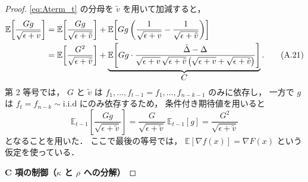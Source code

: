 \documentclass[dvipdfmx,a4paper,11pt]{jsarticle}
\begin{document}
\begin{proof}
\eqref{eq:Aterm_t} の分母を $\tilde{v}$ を用いて加減すると，
\begin{align}
    \mathbb{E}\!\left[\frac{Gg}{\sqrt{\epsilon+v}}\right]
    &= \mathbb{E}\!\left[\frac{Gg}{\sqrt{\epsilon+\tilde{v}}}\right]
     + \mathbb{E}\!\left[
        Gg\left(
          \frac{1}{\sqrt{\epsilon+v}} - \frac{1}{\sqrt{\epsilon+\tilde{v}}}
        \right)
      \right] \notag\\
    &= \mathbb{E}\!\left[\frac{G^2}{\sqrt{\epsilon+\tilde{v}}}\right]
     + \underbrace{\mathbb{E}\!\left[
         Gg \cdot
         \frac{\bar{\Delta} - \Delta}{
           \sqrt{\epsilon+v}\,\sqrt{\epsilon+\tilde{v}}\,
           \bigl(\sqrt{\epsilon+v}+\sqrt{\epsilon+\tilde{v}}\bigr)
         }
       \right]}_{\displaystyle C}.
    \tag{A.21}
    \label{eq:Aterm_decomp_Delta}
\end{align}
第 2 等号では，
$G$ と $\tilde{v}$ は $f_1,\ldots,f_{t-1}=f_1,\ldots,f_{n-k-1}$ のみに依存し，
一方で $g$ は $f_t=f_{n-k}\sim \text{i.i.d} $ にのみ依存するため，
条件付き期待値を用いると
\[
  \mathbb{E}_{t-1}\!\left[\frac{Gg}{\sqrt{\epsilon+\tilde{v}}}\right]
  = \frac{G}{\sqrt{\epsilon+\tilde{v}}}\,\mathbb{E}_{t-1}[g]
  = \frac{G^2}{\sqrt{\epsilon+\tilde{v}}}
\]
となることを用いた．
ここで最後の等号では，
$\mathbb{E}[\nabla f(x)] = \nabla F(x)$ という仮定を使っている．

\medskip
\noindent
\textbf{C 項の制御（$\kappa$ と $\rho$ への分解）}


\end{proof}
\end{document}
